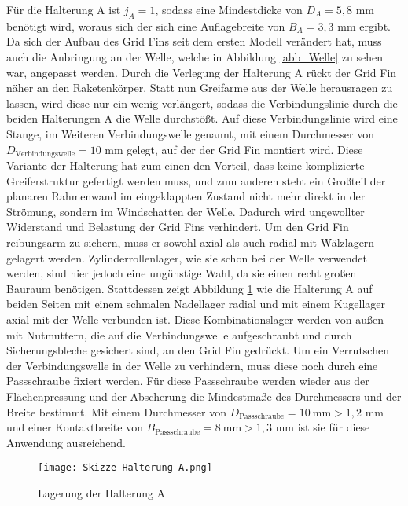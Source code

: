 Für die Halterung A ist $j_A =1$, sodass eine Mindestdicke von $D_A =5,8$ mm benötigt wird, woraus sich der sich eine Auflagebreite von $B_A = 3,3$ mm ergibt. Da sich der Aufbau des Grid Fins seit dem ersten Modell verändert hat, muss auch die Anbringung an der Welle, welche in Abbildung \ref{abb_Welle} zu sehen war, angepasst werden. Durch die Verlegung der Halterung A rückt der Grid Fin näher an den Raketenkörper. Statt nun Greifarme aus der Welle herausragen zu lassen, wird diese nur ein wenig verlängert, sodass die Verbindungslinie durch die beiden Halterungen A die Welle durchstößt. Auf diese Verbindungslinie wird eine Stange, im Weiteren Verbindungswelle genannt, mit einem Durchmesser von $D_\mathrm{Verbindungswelle} = 10$ mm gelegt, auf der der Grid Fin montiert wird. Diese Variante der Halterung hat zum einen den Vorteil, dass keine komplizierte Greiferstruktur gefertigt werden muss, und zum anderen steht ein Großteil der planaren Rahmenwand im eingeklappten Zustand nicht mehr direkt in der Strömung, sondern im Windschatten der Welle. Dadurch wird ungewollter Widerstand und Belastung der Grid Fins verhindert. Um den Grid Fin reibungsarm zu sichern, muss er sowohl axial als auch radial mit Wälzlagern gelagert werden. Zylinderrollenlager, wie sie schon bei der Welle verwendet werden, sind hier jedoch eine ungünstige Wahl, da sie einen recht großen Bauraum benötigen. Stattdessen zeigt Abbildung \ref{abb_Lager_HA} wie die Halterung A auf beiden Seiten mit einem schmalen Nadellager radial  und mit einem Kugellager axial mit der Welle verbunden ist. Diese Kombinationslager werden von außen mit Nutmuttern, die auf die Verbindungswelle aufgeschraubt und durch Sicherungsbleche gesichert sind, an den Grid Fin gedrückt. Um ein Verrutschen der Verbindungswelle in der Welle zu verhindern, muss diese noch durch eine Passschraube fixiert werden. Für diese Passschraube werden wieder aus der Flächenpressung und der Abscherung die Mindestmaße des Durchmessers und der Breite bestimmt. Mit einem Durchmesser von $D_\mathrm{Passschraube} = 10\mathrm{\ mm}> 1,2$ mm und einer Kontaktbreite von $B_\mathrm{Passschraube} = 8\mathrm{\ mm}> 1,3$ mm ist sie für diese Anwendung ausreichend.
\begin{figure}[h] 
	\centering
	\texttt{[image: Skizze Halterung A.png]}
	\caption{Lagerung der Halterung A}
	\label{abb_Lager_HA}
\end{figure}\\
